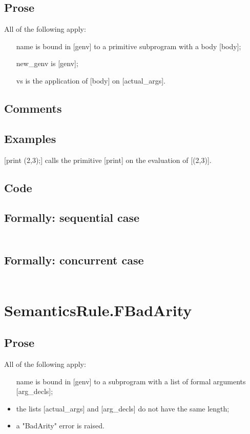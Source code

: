 \documentclass{book}
\begin{document}
  \subsection{Prose}
  All of the following apply:
  \begin{itemize}
  \item [name] is bound in [genv] to a primitive subprogram with a body [body];
  \item [new\_genv] is [genv];
  \item [vs] is the application of [body] on [actual\_args].
  \end{itemize}

  \subsection{Comments}

  \subsection{Examples}
  [print (2,3);] calls the primitive [print] on the evaluation of [(2,3)].

  \subsection{Code}

  \subsection{Formally: sequential case}
  \begin{align}
  \end{align} 

  \subsection{Formally: concurrent case}
  \begin{align}
  \end{align} 

\section{SemanticsRule.FBadArity \label{sec:SemanticsRule.FBadArity}}

  \subsection{Prose}
  All of the following apply:
  \begin{itemize}
  \item [name] is bound in [genv] to a subprogram with a list of formal arguments
    [arg\_decls];
  \item the lists [actual\_args] and [arg\_decls] do not have the same length;
  \item a "BadArity" error is raised.
  \end{itemize}
\end{document}
